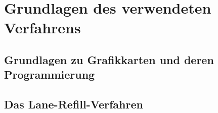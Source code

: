 \chapter{Grundlagen des verwendeten Verfahrens}

\section{Grundlagen zu Grafikkarten und deren Programmierung}

\section{Das Lane-Refill-Verfahren}
